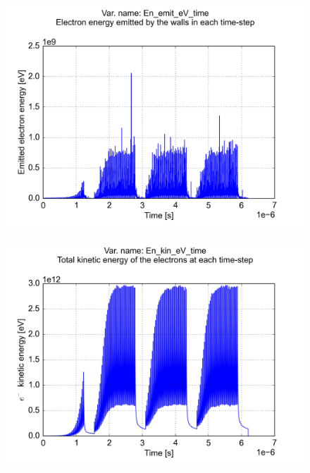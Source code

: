\documentclass[a4paper,12pt]{article}
\begin{document}
\begin{figure}[p]
\begin{center}
\includegraphics[trim = 0 0 0 0, clip, width=.95\textwidth]{../../example/fig06.png}
\end{center}
\end{figure}

\FloatBarrier

\begin{figure}[p]
\begin{center}
\includegraphics[trim = 0 0 0 0, clip, width=.95\textwidth]{../../example/fig07.png}
\end{center}
\end{figure}
\end{document}
